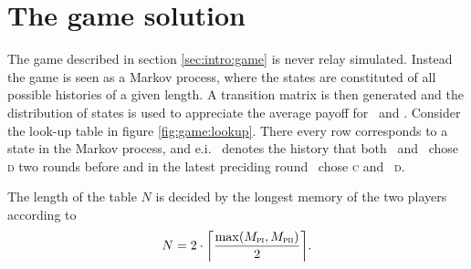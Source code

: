 \section{The game solution}\label{sec:game}
The game described in section \ref{sec:intro:game} is never relay simulated. Instead the game is seen as a Markov process, where the states are constituted of all possible histories of a given length. A transition matrix is then generated and the distribution of states is used to appreciate the average payoff for \pone\ and \ptwo. Consider the look-up table in figure \ref{fig:game:lookup}. There every row corresponds to a state in the Markov process, and e.i.\  denotes the history that both \pone\ and \ptwo\ chose \textsc{d} two rounds before and in the latest preciding round \pone\ chose \textsc{c} and \ptwo\ \textsc{d}.\mypar

The length of the table $N$ is decided by the longest memory of the two players according to
\begin{equation*}
N = 2\cdot{\left\lceil{\frac{\max(M_{\textsc{pi}}, M_{\textsc{pii}})}{2}}\right\rceil}.
\end{equation*}


